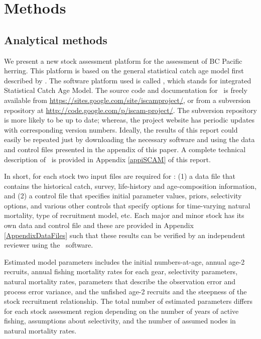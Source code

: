 \section{Methods}


	\subsection{Analytical methods}
	We present a new stock assessment platform for the assessment of BC Pacific herring. This platform is based on the general statistical catch age model first described by \cite{fournier1982general}.  The software platform used is called \iscam, which stands for integrated Statistical Catch Age Model.  The source code and documentation for \iscam\ is freely available from \url{https://sites.google.com/site/iscamproject/}, or from a subversion repository at \url{http://code.google.com/p/iscam-project/}.  The subversion repository is more likely to be up to date; whereas, the project website has periodic updates with corresponding version numbers.  Ideally, the results of this report could easily be repeated just by downloading the necessary software and using the data and control files presented in the appendix of this paper. A complete technical description of \iscam\ is provided in Appendix \ref{appiSCAM} of this report.
	
	In short, for each stock  two input files are required for \iscam: (1) a data file that contains the historical catch, survey, life-history and age-composition information, and (2) a control file that specifies initial parameter values, priors, selectivity options, and various other controls that specify options for time-varying natural mortality, type of recruitment model, etc.  Each major and minor stock has its own data and control file and these are provided in Appendix \ref{AppendixDataFiles} such that these results can be verified by an independent reviewer using the \iscam\ software.
	
	Estimated model parameters includes the initial numbers-at-age, annual age-2 recruits, annual fishing mortality rates for each gear, selectivity parameters, natural mortality rates, parameters that describe the observation error and process error variance, and the unfished age-2 recruits and the steepness of the stock recruitment relationship.  The total number of estimated parameters differs for each stock assessment region depending on the number of years of active fishing, assumptions about selectivity, and the number of assumed nodes in natural mortality rates.  
	
